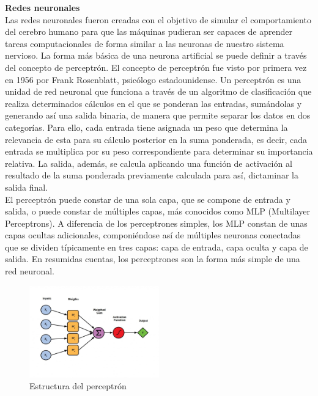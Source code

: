 \textbf{Redes neuronales}\\

Las redes neuronales fueron creadas con el objetivo de simular el comportamiento del cerebro humano para que las máquinas pudieran ser capaces de aprender tareas computacionales de forma similar a las neuronas de nuestro sistema nervioso. La forma más básica de una neurona artificial se puede definir a través del concepto de perceptrón. El concepto de perceptrón fue visto por primera vez en 1956 por Frank Rosenblatt, psicólogo estadounidense. Un perceptrón es una unidad de red neuronal que funciona a través de un algoritmo de clasificación que realiza determinados cálculos en el que se ponderan las entradas, sumándolas y generando así una salida binaria, de manera que permite separar los datos en dos categorías. Para ello, cada entrada tiene asignada un peso que determina la relevancia de esta para su cálculo posterior en la suma ponderada, es decir, cada entrada se multiplica por su peso correspondiente para determinar su importancia relativa. La salida, además, se calcula aplicando una función de activación al resultado de la suma ponderada previamente calculada para así, dictaminar la salida final.\\

El perceptrón puede constar de una sola capa, que se compone de entrada y salida, o puede constar de múltiples capas, más conocidos como MLP (Multilayer Perceptrons). A diferencia de los perceptrones simples, los MLP constan de unas capas ocultas adicionales, componiéndose así de múltiples neuronas conectadas que se dividen típicamente en tres capas: capa de entrada, capa oculta y capa de salida. En resumidas cuentas, los perceptrones son la forma más simple de una red neuronal.\\

\begin{figure}[h]
	\centering
	\includegraphics[width = 0.5\textwidth]{Imagenes/Vectorial/Perceptrones.jpeg}
	\caption{Estructura del perceptrón}
	\label{fig:sampleImage}
\end{figure}

